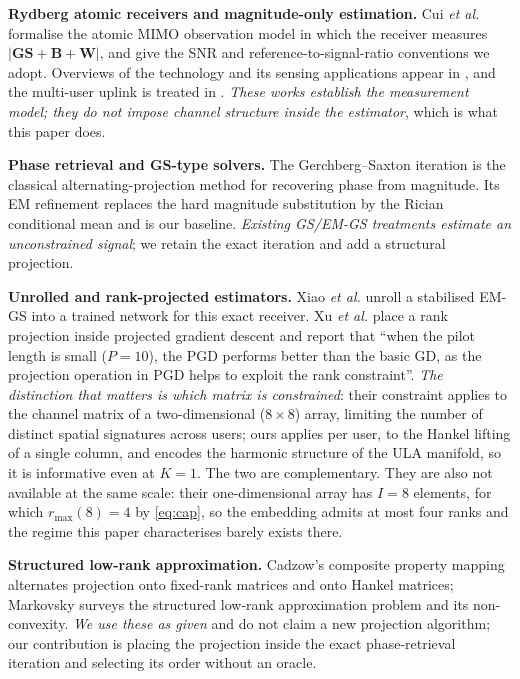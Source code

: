 \documentclass[journal]{IEEEtran}
\newcommand{\bG}{\mathbf{G}}
\newcommand{\bS}{\mathbf{S}}
\newcommand{\bB}{\mathbf{B}}
\newcommand{\bW}{\mathbf{W}}
\newcommand{\rmax}{r_{\max}}
\begin{document}
\textbf{Rydberg atomic receivers and magnitude-only estimation.} Cui \emph{et
al.} \cite{cui2025} formalise the atomic MIMO observation model in which the
receiver measures $|\bG\bS+\bB+\bW|$, and give the SNR and
reference-to-signal-ratio conventions we adopt. Overviews of the technology and
its sensing applications appear in \cite{gong2025mag,zhang2024}, and the
multi-user uplink is treated in \cite{gong2025icc}. \emph{These works establish
the measurement model; they do not impose channel structure inside the
estimator}, which is what this paper does.

\textbf{Phase retrieval and GS-type solvers.} The Gerchberg--Saxton iteration
\cite{gerchberg1972} is the classical alternating-projection method for
recovering phase from magnitude. Its EM refinement replaces the hard magnitude
substitution by the Rician conditional mean and is our baseline. \emph{Existing
GS/EM-GS treatments estimate an unconstrained signal}; we retain the exact
iteration and add a structural projection.

\textbf{Unrolled and rank-projected estimators.} Xiao \emph{et al.}
\cite{xiao2026} unroll a stabilised EM-GS into a trained network for this exact
receiver. Xu \emph{et al.} \cite{xu2025} place a rank projection inside
projected gradient descent and report that ``when the pilot length is small
($P=10$), the PGD performs better than the basic GD, as the projection
operation in PGD helps to exploit the rank constraint''. \emph{The distinction
that matters is which matrix is constrained}: their constraint applies to the
channel matrix of a two-dimensional ($8\times8$) array, limiting the number of
distinct spatial signatures across users; ours applies per user, to the Hankel
lifting of a single column, and encodes the harmonic structure of the ULA
manifold, so it is informative even at $K=1$. The two are complementary. They
are also not available at the same scale: their one-dimensional array has $I=8$
elements, for which $\rmax(8)=4$ by \eqref{eq:cap}, so the embedding admits at
most four ranks and the regime this paper characterises barely exists there.

\textbf{Structured low-rank approximation.} Cadzow's composite property mapping
\cite{cadzow1988} alternates projection onto fixed-rank matrices and onto
Hankel matrices; Markovsky \cite{markovsky2008} surveys the structured low-rank
approximation problem and its non-convexity. \emph{We use these as given} and
do not claim a new projection algorithm; our contribution is placing the
projection inside the exact phase-retrieval iteration and selecting its order
without an oracle.
\end{document}

